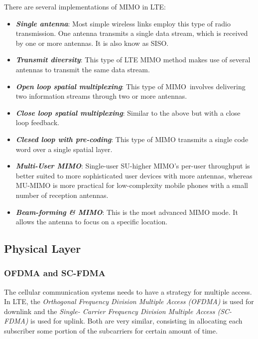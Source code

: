 There are several implementations of MIMO in LTE:
\begin{itemize}[topsep=0pt]
  \item \textbf{\textit{Single antenna}}: Most simple wireless links employ this type of radio 
  transmission. One antenna transmits a single data stream, which is received by one or more 
  antennas. It is also know as SISO.
  \item \textbf{\textit{Transmit diversity}}: This type of LTE MIMO method makes use of several 
  antennas to transmit the same data stream.
  \item \textbf{\textit{Open loop spatial multiplexing}}: This type of MIMO involves delivering 
  two information streams through two or more antennas.
  \item \textbf{\textit{Close loop spatial multiplexing}}: Similar to the above but with a close 
  loop feedback.
  \item \textbf{\textit{Clesed loop with pre-coding}}: This type of MIMO transmits a single code word 
  over a single spatial layer.
  \item \textbf{\textit{Multi-User MIMO}}: Single-user SU-higher MIMO's per-user throughput is better 
  suited to more sophisticated user devices with more antennas, whereas MU-MIMO is more practical
  for low-complexity mobile phones with a small number of reception antennas.
  \item \textbf{\textit{Beam-forming \& MIMO}}: This is the most advanced MIMO mode. It allows
   the antenna to focus on a specific location.

\end{itemize}

\subsection{Physical Layer}



\subsubsection{OFDMA and SC-FDMA}
The cellular communication systems needs to have a strategy for multiple access. In LTE, the 
\textit{Orthogonal Frequency Division Multiple Access (OFDMA)} is used for downlink and the \textit{Single-
Carrier Frequency Division Multiple Access (SC-FDMA)} is used for uplink. Both are very similar, consisting
in allocating each subscriber some portion of the subcarriers for certain amount of time.

